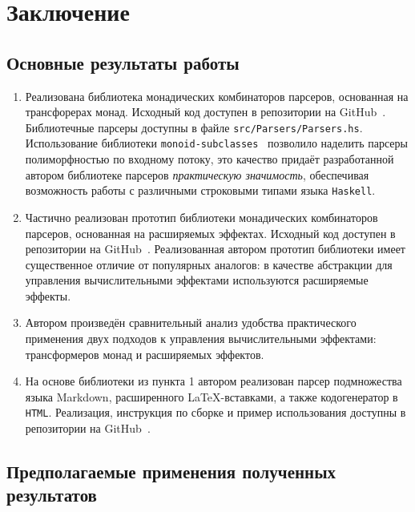 \chapter{Заключение}

\section{Основные результаты работы} 
  \begin{enumerate}
    
    \item Реализована библиотека монадических комбинаторов парсеров, основанная 
    на трансфорерах монад. Исходный код доступен в репозитории на GitHub~\cite{mdParse}. Библиотечные парсеры доступны в файле \lstinline{src/Parsers/Parsers.hs}. 
    Использование библиотеки \lstinline{monoid-subclasses}~\cite{monoidSubclassesHackage} 
    позволило наделить парсеры полиморфностью по входному потоку, это качество 
    придаёт разработанной автором библиотеке парсеров \emph{практическую значимость}, 
    обеспечивая возможность работы с различными строковыми типами языка 
    \lstinline{Haskell}.  

    \item Частично реализован прототип библиотеки монадических комбинаторов 
    парсеров, основанная на расширяемых эффектах. Исходный код доступен в 
    репозитории на GitHub~\cite{mdParse}. Реализованная автором прототип библиотеки
    имеет существенное отличие от популярных аналогов: в качестве абстракции 
    для управления вычислительными эффектами используются расширяемые эффекты.

    \item Автором произведён сравнительный анализ удобства практического применения 
    двух подходов к управления вычислительными эффектами: трансформеров монад 
    и расширяемых эффектов. 

    \item На основе библиотеки из пункта 1 автором реализован парсер подмножества языка
    Markdown, расширенного \LaTeX-вставками, а также кодогенератор в 
    \lstinline{HTML}. Реализация, инструкция по сборке и пример использования 
    доступны в репозитории на GitHub~\cite{mdParse}. 
  \end{enumerate}

\section{Предполагаемые применения полученных результатов}

